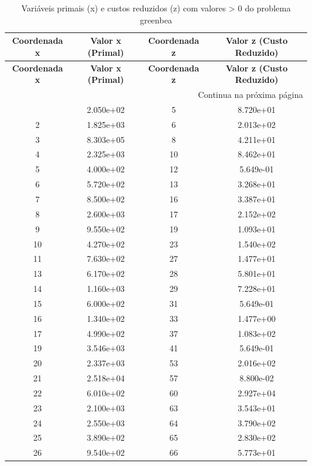 \documentclass[12pt]{article}
\begin{document}
\begin{longtable}{@{}cccc@{}}
\caption{Variáveis primais (x) e custos reduzidos (z) com valores > 0 do problema greenbea} \\
\toprule
\textbf{Coordenada x} & \textbf{Valor x (Primal)} & \textbf{Coordenada z} & \textbf{Valor z (Custo Reduzido)} \\
\midrule
\endfirsthead

\toprule
\textbf{Coordenada x} & \textbf{Valor x (Primal)} & \textbf{Coordenada z} & \textbf{Valor z (Custo Reduzido)} \\
\midrule
\endhead

\midrule \multicolumn{4}{r}{{Continua na próxima página}} \\ \midrule
\endfoot

\bottomrule
\endlastfoot
1 & 2.050e+02 & 5 & 8.720e+01 \\
2 & 1.825e+03 & 6 & 2.013e+02 \\
3 & 8.303e+05 & 8 & 4.211e+01 \\
4 & 2.325e+03 & 10 & 8.462e+01 \\
5 & 4.000e+02 & 12 & 5.649e-01 \\
6 & 5.720e+02 & 13 & 3.268e+01 \\
7 & 8.500e+02 & 16 & 3.387e+01 \\
8 & 2.600e+03 & 17 & 2.152e+02 \\
9 & 9.550e+02 & 19 & 1.093e+01 \\
10 & 4.270e+02 & 23 & 1.540e+02 \\
11 & 7.630e+02 & 27 & 1.477e+01 \\
13 & 6.170e+02 & 28 & 5.801e+01 \\
14 & 1.160e+03 & 29 & 7.228e+01 \\
15 & 6.000e+02 & 31 & 5.649e-01 \\
16 & 1.340e+02 & 33 & 1.477e+00 \\
17 & 4.990e+02 & 37 & 1.083e+02 \\
19 & 3.546e+03 & 41 & 5.649e-01 \\
20 & 2.337e+03 & 53 & 2.016e+02 \\
21 & 2.518e+04 & 57 & 8.800e-02 \\
22 & 6.010e+02 & 60 & 2.927e+04 \\
23 & 2.100e+03 & 63 & 3.543e+01 \\
24 & 2.550e+03 & 64 & 3.790e+02 \\
25 & 3.890e+02 & 65 & 2.830e+02 \\
26 & 9.540e+02 & 66 & 5.773e+01 \\

\end{longtable}
\end{document}
